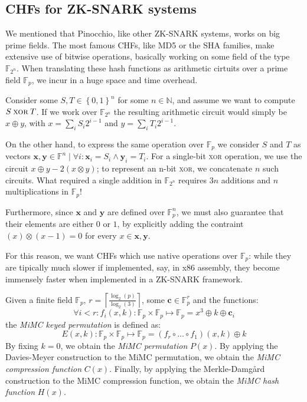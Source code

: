 \subsection{CHFs for ZK-SNARK systems}
We mentioned that Pinocchio, like other ZK-SNARK systems, works on big prime fields.
The most famous CHFs, like MD5 or the SHA families, make extensive use of bitwise operations,
basically working on some field of the type \(\mathbb{F}_{2^n}\).
When translating these hash functions as arithmetic cirtuits over a prime field \(\mathbb{F}_p\),
we incur in a huge space and time overhead.
\begin{example}
	Consider some \(S, T \in {\left\{0, 1\right\}}^n\) for some \(n \in \mathbb{N}\), and assume we
	want to compute \(S \mathbin{\textsc{xor}} T\).
	If we work over \(\mathbb{F}_{2^n}\) the resulting arithmetic circuit would simply be
	\(x \oplus y\), with \(x = \sum_{i}{S_{i}2^{i-1}}\) and \(y = \sum_{i}{T_{i}2^{i-1}}\).

	On the other hand, to express the same operation over \(\mathbb{F}_p\) we consider \(S\) and
	\(T\) as vectors
	\(\bm{x}, \bm{y} \in \mathbb{F}^n \mid \forall i\colon \bm{x}_i = S_i \wedge \bm{y}_i = T_i\).
	For a single-bit \textsc{xor} operation, we use the circuit
	\(x \oplus y - 2\left(x \otimes y\right) \); to represent an n-bit \textsc{xor}, we concatenate
	\(n\) such circuits.
	What required a single addition in \(\mathbb{F}_{2^n}\) requires \(3n\) additions and \(n\)
	multiplications in \(\mathbb{F}_p\)!

	Furthermore, since \(\bm{x}\) and \(\bm{y}\) are defined over \(\mathbb{F}_p^n\), we must also
	guarantee that their elements are either \(0\) or \(1\), by explicitly adding the contraint
	\(\left(x\right) \otimes \left(x - 1\right) = 0\) for every \(x \in \bm{x}, \bm{y}\).
\end{example}

For this reason, we want CHFs which use native operations over \(\mathbb{F}_p\):
while they are tipically much slower if implemented, say, in x86 assembly, they become
immensely faster when implemented in a ZK-SNARK framework.

\begin{definition}
	Given a finite field \(\mathbb{F}_p\),
	\(r = \left\lceil{\frac{\log_2\left(p\right)}{\log_2\left(3\right)}}\right\rceil \), some
	\(\bm{c} \in \mathbb{F}_p^r\) and the functions:
	\[\forall i < r\colon f_i\left(x,k\right)\colon \mathbb{F}_p \times \mathbb{F}_p \mapsto
		\mathbb{F}_p = x^3 \oplus k \oplus \bm{c}_i\]
	the \emph{MiMC keyed permutation} is defined as:
	\[E\left(x, k\right)\colon \mathbb{F}_p \times \mathbb{F}_p \mapsto \mathbb{F}_p =
		\left(f_{r} \circ \dots \circ f_1\right)\left(x, k\right) \oplus k\]
	By fixing \(k = 0\), we obtain the \emph{MiMC permutation} \(P\left(x\right)\).
	By applying the Davies-Meyer construction to the MiMC permutation, we obtain the
	\emph{MiMC compression function} \(C\left(x\right)\).
	Finally, by applying the Merkle-Damg\r{a}rd construction to the MiMC compression function, we
	obtain the \emph{MiMC hash function} \(H\left(x\right)\).
\end{definition}
